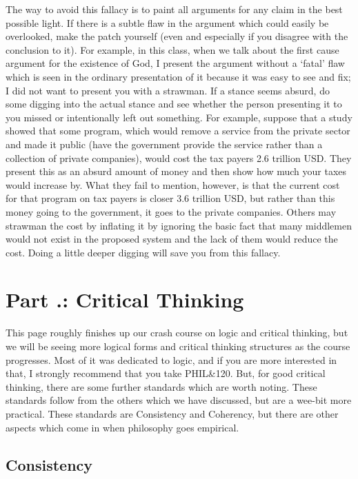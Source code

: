 The way to avoid this fallacy is to paint all arguments for any claim in the best possible light. If there is a subtle flaw in the argument which could easily be overlooked, make the patch yourself (even and especially if you disagree with the conclusion to it). For example, in this class, when we talk about the first cause argument for the existence of God, I present the argument without a `fatal' flaw which is seen in the ordinary presentation of it because it was easy to see and fix; I did not want to present you with a strawman.  If a stance seems absurd, do some digging into the actual stance and see whether the person presenting it to you missed or intentionally left out something. For example, suppose that a study showed that some program, which would remove a service from the private sector and made it public (have the government provide the service rather than a collection of private companies), would cost the tax payers 2.6 trillion USD. They present this as an absurd amount of money and then show how much your taxes would increase by. What they fail to mention, however, is that the current cost for that program on tax payers is closer 3.6 trillion USD, but rather than this money going to the government, it goes to the private companies. Others may strawman the cost by inflating it by ignoring the basic fact that many middlemen would not exist in the proposed system and the lack of them would reduce the cost. Doing a little deeper digging will save you from this fallacy. 

\section{Part \thechapcount.\theseccount: Critical Thinking}

This page roughly finishes up our crash course on logic and critical thinking, but we will be seeing more logical forms and critical thinking structures as the course progresses. Most of it was dedicated to logic, and if you are more interested in that, I strongly recommend that you take PHIL\&120. But, for good critical thinking, there are some further standards which are worth noting. These standards follow from the others which we have discussed, but are a wee-bit more practical. These standards are Consistency and Coherency, but there are other aspects which come in when philosophy goes empirical.

\subsection{Consistency}

